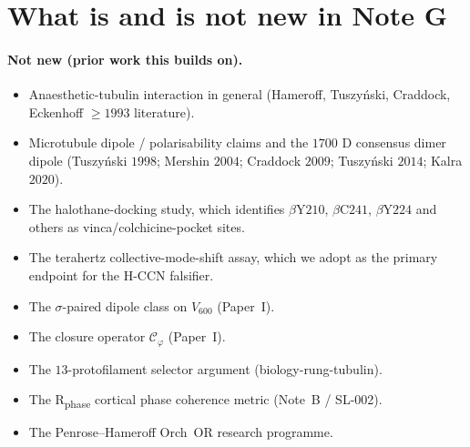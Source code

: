\documentclass[11pt,a4paper]{article}
\begin{document}
\section{What is and is not new in Note G}

\paragraph{Not new (prior work this builds on).}
\begin{itemize}\itemsep0pt
  \item Anaesthetic-tubulin interaction in general (Hameroff, Tuszy{\'n}ski,
    Craddock, Eckenhoff $\geq 1993$ literature).
  \item Microtubule dipole / polarisability claims and the $1700$ D
    consensus dimer dipole (Tuszy{\'n}ski $1998$; Mershin $2004$;
    Craddock $2009$; Tuszy{\'n}ski $2014$; Kalra $2020$).
  \item The \citet{Craddock2012} halothane-docking study, which
    identifies $\beta$Y$210$, $\beta$C$241$, $\beta$Y$224$ and others
    as vinca/colchicine-pocket sites.
  \item The \citet{Craddock2017} terahertz collective-mode-shift assay,
    which we adopt as the primary endpoint for the H-CCN falsifier.
  \item The $\sigma$-paired dipole class on $V_{600}$ (Paper~I).
  \item The closure operator $\mathcal{C}_\varphi$ (Paper~I).
  \item The $13$-protofilament selector argument (biology-rung-tubulin).
  \item The R\textsubscript{phase} cortical phase coherence metric (Note~B / SL-002).
  \item The Penrose--Hameroff Orch~OR research programme.
\end{itemize}
\end{document}
